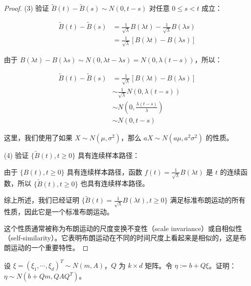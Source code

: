 \documentclass[lang=cn,10pt,thmcnt=section]{elegantbook}
\begin{document}
\begin{proof}
		(3) 验证 $\tilde{B}(t) - \tilde{B}(s) \sim N(0, t-s)$ 对任意 $0 \leq s < t$ 成立：
		
		\begin{align}
		\tilde{B}(t) - \tilde{B}(s) &= \frac{1}{\sqrt{\lambda}} B(\lambda t) - \frac{1}{\sqrt{\lambda}} B(\lambda s) \\
		&= \frac{1}{\sqrt{\lambda}} [B(\lambda t) - B(\lambda s)]
		\end{align}
		
		由于 $B(\lambda t) - B(\lambda s) \sim N(0, \lambda t - \lambda s) = N(0, \lambda(t-s))$，所以：
		
		\begin{align}
		\tilde{B}(t) - \tilde{B}(s) &= \frac{1}{\sqrt{\lambda}} [B(\lambda t) - B(\lambda s)] \\
		&\sim \frac{1}{\sqrt{\lambda}} N(0, \lambda(t-s)) \\
		&\sim N\left(0, \frac{\lambda(t-s)}{\lambda}\right) \\
		&\sim N(0, t-s)
		\end{align}
		
		这里，我们使用了如果 $X \sim N(\mu, \sigma^2)$，那么 $aX \sim N(a\mu, a^2\sigma^2)$ 的性质。
		
		(4) 验证 $\{\tilde{B}(t), t \geq 0\}$ 具有连续样本路径：
		
		由于 $\{B(t), t \geq 0\}$ 具有连续样本路径，函数 $f(t) = \frac{1}{\sqrt{\lambda}} B(\lambda t)$ 是 $t$ 的连续函数，所以 $\{\tilde{B}(t), t \geq 0\}$ 也具有连续样本路径。
		
		综上所述，我们已经证明 $\{\tilde{B}(t) = \frac{1}{\sqrt{\lambda}} B(\lambda t), t \geq 0\}$ 满足标准布朗运动的所有性质，因此它是一个标准布朗运动。
		
		这个性质通常被称为布朗运动的尺度变换不变性（scale invariance）或自相似性（self-similarity）。它表明布朗运动在不同的时间尺度上看起来是相似的，这是布朗运动的一个重要特性。
\end{proof}



\begin{example}
	设 $\xi = (\xi_1, \cdots, \xi_d)^T \sim N(m, A)$，$Q$ 为 $k \times d$ 矩阵。令 $\eta := b + Q\xi$。证明：$\eta \sim N(b + Qm, QAQ^T)$。
\end{example}
\end{document}
